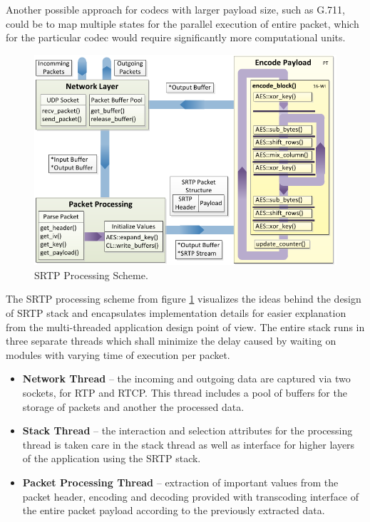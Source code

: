 Another possible approach for codecs with larger payload size, such as G.711, 
could be to map multiple states for the parallel execution of entire packet, 
which for the particular codec would require significantly more computational 
units. 

\vspace{1em}

\begin{figure}[h!]
\centering
\includegraphics[width=15cm]{fig/paral_scheme.pdf}
\caption{SRTP Processing Scheme.}
\label{scheme}
\end{figure}

The SRTP processing scheme from figure \ref{scheme} visualizes the ideas behind
the design of SRTP stack and encapsulates implementation details for easier
explanation from the multi-threaded application design point of view. 
The entire stack runs in three separate threads which shall minimize the delay 
caused by waiting on modules with varying time of execution per packet.
\begin{itemize}
\item \textbf{Network Thread} -- the incoming and outgoing data are captured
via two sockets, for RTP and RTCP. This thread includes a pool of buffers for
the storage of packets and another the processed data.
\item \textbf{Stack Thread} -- the interaction and selection attributes for
the processing thread is taken care in the stack thread as well as interface
for higher layers of the application using the SRTP stack.
\item \textbf{Packet Processing Thread} -- extraction of important values from
the packet header, encoding and decoding provided with transcoding interface of 
the entire packet payload according to the previously extracted data.
\end{itemize} 

